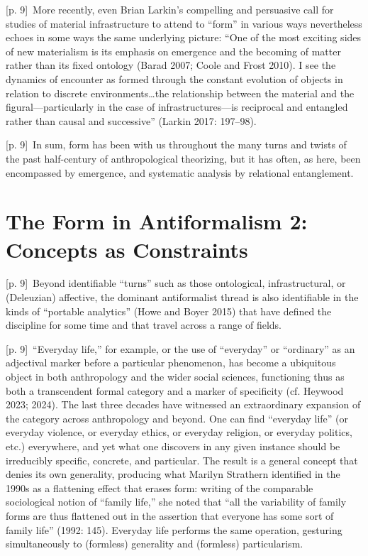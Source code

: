 \documentclass[10pt,a4paper]{article}
\begin{document}
{\scriptsize\color{gray} [p. 9]}\ More recently, even Brian Larkin’s compelling and persuasive call for studies of material infrastructure to attend to “form” in various ways nevertheless echoes in some ways the same underlying picture: “One of the most exciting sides of new materialism is its emphasis on emergence and the becoming of matter rather than its fixed ontology (Barad 2007; Coole and Frost 2010). I see the dynamics of encounter as formed through the constant evolution of objects in relation to discrete environments…the relationship between the material and the figural—particularly in the case of infrastructures—is reciprocal and entangled rather than causal and successive” (Larkin 2017: 197–98).\par
{\scriptsize\color{gray} [p. 9]}\ In sum, form has been with us throughout the many turns and twists of the past half-century of anthropological theorizing, but it has often, as here, been encompassed by emergence, and systematic analysis by relational entanglement.\par
{}\section*{The Form in Antiformalism 2: Concepts as Constraints}
{\scriptsize\color{gray} [p. 9]}\ Beyond identifiable “turns” such as those ontological, infrastructural, or (Deleuzian) affective, the dominant antiformalist thread is also identifiable in the kinds of “portable analytics” (Howe and Boyer 2015) that have defined the discipline for some time and that travel across a range of fields.\par
{\scriptsize\color{gray} [p. 9]}\ “Everyday life,” for example, or the use of “everyday” or “ordinary” as an adjectival marker before a particular phenomenon, has become a ubiquitous object in both anthropology and the wider social sciences, functioning thus as both a transcendent formal category and a marker of specificity (cf. Heywood 2023; 2024). The last three decades have witnessed an extraordinary expansion of the category across anthropology and beyond. One can find “everyday life” (or everyday violence, or everyday ethics, or everyday religion, or everyday politics, etc.) everywhere, and yet what one discovers in any given instance should be irreducibly specific, concrete, and particular. The result is a general concept that denies its own generality, producing what Marilyn Strathern identified in the 1990s as a flattening effect that erases form: writing of the comparable sociological notion of “family life,” she noted that “all the variability of family forms are thus flattened out in the assertion that everyone has some sort of family life” (1992: 145). Everyday life performs the same operation, gesturing simultaneously to (formless) generality and (formless) particularism.\par
\end{document}
